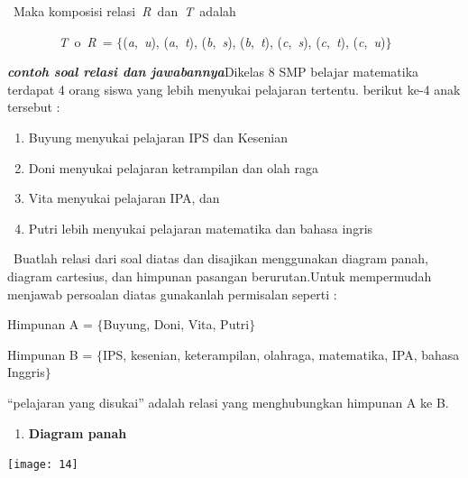 \documentclass[11pt,fleqn]{book} %
\begin{document}
\noindent {\O}~Maka komposisi relasi~\textit{R~}dan~\textit{T~}adalah

\noindent \textit{~~~~~~~~T~}$\mathrm{o}$~\textit{R~}= $\{$(\textit{a},~\textit{u}), (\textit{a},~\textit{t}), (\textit{b},~\textit{s}), (\textit{b},~\textit{t}), (\textit{c},~\textit{s}), (\textit{c},~\textit{t}), (\textit{c},~\textit{u})$\}$

\noindent 

\noindent \textbf{\textit{contoh soal relasi dan jawabannya}}Dikelas 8 SMP belajar matematika terdapat 4 orang siswa yang lebih menyukai pelajaran tertentu. berikut ke-4 anak tersebut :

\begin{enumerate}
\item  Buyung menyukai pelajaran IPS dan Kesenian

\item  Doni menyukai pelajaran ketrampilan dan olah raga

\item  Vita menyukai pelajaran IPA, dan

\item  Putri lebih menyukai pelajaran matematika dan bahasa ingris
\end{enumerate}

\noindent ~Buatlah relasi dari soal diatas dan disajikan menggunakan diagram panah, diagram cartesius, dan himpunan pasangan berurutan.\textit{}Untuk mempermudah menjawab persoalan diatas gunakanlah permisalan seperti :

\noindent 

\noindent Himpunan A = $\{$Buyung, Doni, Vita, Putri$\}$

\noindent Himpunan B = $\{$IPS, kesenian, keterampilan, olahraga, matematika, IPA, bahasa Inggris$\}$

\noindent ``pelajaran yang disukai'' adalah relasi yang menghubungkan himpunan A ke B.

\noindent 

\noindent 

\noindent 

\noindent 

\noindent 

\noindent 

\begin{enumerate}
\item  \textbf{Diagram panah}
\end{enumerate}

\begin{center}
\noindent \texttt{[image: 14]}~
\end{center}
\end{document}
